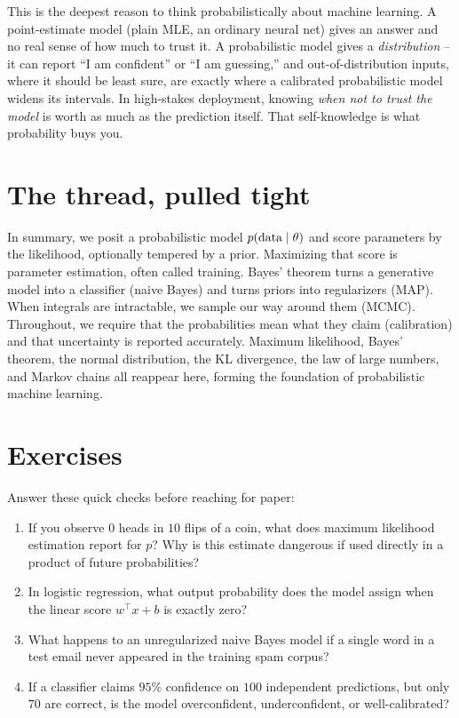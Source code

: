\begin{aestheticbox}
This is the deepest reason to think probabilistically about machine learning.
A point-estimate model (plain MLE, an ordinary neural net) gives an answer and no
real sense of how much to trust it. A probabilistic model gives a
\emph{distribution} -- it can report ``I am confident'' or ``I am guessing,'' and
out-of-distribution inputs, where it should be least sure, are exactly where a
calibrated probabilistic model widens its intervals. In high-stakes deployment,
knowing \emph{when not to trust the model} is worth as much as the prediction
itself. That self-knowledge is what probability buys you.
\end{aestheticbox}

\section{The thread, pulled tight}

In summary, we posit a probabilistic model $p(\text{data}\mid\theta)$ and score parameters by the likelihood, optionally tempered by a prior. Maximizing that score is parameter estimation, often called training. Bayes' theorem turns a generative model into a classifier (naive Bayes) and turns priors into regularizers (MAP). When integrals are intractable, we sample our way around them (MCMC). Throughout, we require that the probabilities mean what they claim (calibration) and that uncertainty is reported accurately. Maximum likelihood, Bayes' theorem, the normal distribution, the KL divergence, the law of large numbers, and Markov chains all reappear here, forming the foundation of probabilistic machine learning.

\section{Exercises}
\label{ch34:exercises}

\begin{exercise}
\label{ch34:ex-warmup}
Answer these quick checks before reaching for paper:
\begin{enumerate}[label=(\alph*)]
  \item If you observe $0$ heads in $10$ flips of a coin, what does maximum likelihood estimation report for $p$? Why is this estimate dangerous if used directly in a product of future probabilities?
  \item In logistic regression, what output probability does the model assign when the linear score $w^\top x + b$ is exactly zero?
  \item What happens to an unregularized naive Bayes model if a single word in a test email never appeared in the training spam corpus?
  \item If a classifier claims $95\%$ confidence on $100$ independent predictions, but only $70$ are correct, is the model overconfident, underconfident, or well-calibrated?
\end{enumerate}
\end{exercise}


